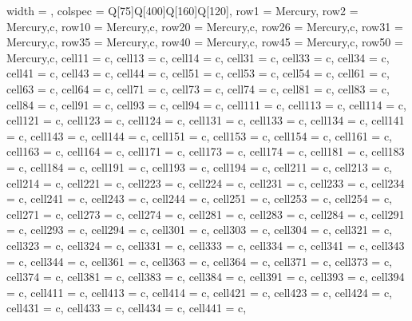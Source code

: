 \begin{longtblr}
[
caption={Tabela de requisitos funcionais},
label={tab:1},
]
{
 width = \linewidth,
 colspec = {Q[75]Q[400]Q[160]Q[120]},
 row{1} = {Mercury},
 row{2} = {Mercury,c},
 row{10} = {Mercury,c},
 row{20} = {Mercury,c},
 row{26} = {Mercury,c},
 row{31} = {Mercury,c},
 row{35} = {Mercury,c},
 row{40} = {Mercury,c},
 row{45} = {Mercury,c},
 row{50} = {Mercury,c},
 cell{1}{1} = {c},
 cell{1}{3} = {c},
 cell{1}{4} = {c},
 cell{3}{1} = {c},
 cell{3}{3} = {c},
 cell{3}{4} = {c},
 cell{4}{1} = {c},
 cell{4}{3} = {c},
 cell{4}{4} = {c},
 cell{5}{1} = {c},
 cell{5}{3} = {c},
 cell{5}{4} = {c},
 cell{6}{1} = {c},
 cell{6}{3} = {c},
 cell{6}{4} = {c},
 cell{7}{1} = {c},
 cell{7}{3} = {c},
 cell{7}{4} = {c},
 cell{8}{1} = {c},
 cell{8}{3} = {c},
 cell{8}{4} = {c},
 cell{9}{1} = {c},
 cell{9}{3} = {c},
 cell{9}{4} = {c},
 cell{11}{1} = {c},
 cell{11}{3} = {c},
 cell{11}{4} = {c},
 cell{12}{1} = {c},
 cell{12}{3} = {c},
 cell{12}{4} = {c},
 cell{13}{1} = {c},
 cell{13}{3} = {c},
 cell{13}{4} = {c},
 cell{14}{1} = {c},
 cell{14}{3} = {c},
 cell{14}{4} = {c},
 cell{15}{1} = {c},
 cell{15}{3} = {c},
 cell{15}{4} = {c},
 cell{16}{1} = {c},
 cell{16}{3} = {c},
 cell{16}{4} = {c},
 cell{17}{1} = {c},
 cell{17}{3} = {c},
 cell{17}{4} = {c},
 cell{18}{1} = {c},
 cell{18}{3} = {c},
 cell{18}{4} = {c},
 cell{19}{1} = {c},
 cell{19}{3} = {c},
 cell{19}{4} = {c},
 cell{21}{1} = {c},
 cell{21}{3} = {c},
 cell{21}{4} = {c},
 cell{22}{1} = {c},
 cell{22}{3} = {c},
 cell{22}{4} = {c},
 cell{23}{1} = {c},
 cell{23}{3} = {c},
 cell{23}{4} = {c},
 cell{24}{1} = {c},
 cell{24}{3} = {c},
 cell{24}{4} = {c},
 cell{25}{1} = {c},
 cell{25}{3} = {c},
 cell{25}{4} = {c},
 cell{27}{1} = {c},
 cell{27}{3} = {c},
 cell{27}{4} = {c},
 cell{28}{1} = {c},
 cell{28}{3} = {c},
 cell{28}{4} = {c},
 cell{29}{1} = {c},
 cell{29}{3} = {c},
 cell{29}{4} = {c},
 cell{30}{1} = {c},
 cell{30}{3} = {c},
 cell{30}{4} = {c},
 cell{32}{1} = {c},
 cell{32}{3} = {c},
 cell{32}{4} = {c},
 cell{33}{1} = {c},
 cell{33}{3} = {c},
 cell{33}{4} = {c},
 cell{34}{1} = {c},
 cell{34}{3} = {c},
 cell{34}{4} = {c},
 cell{36}{1} = {c},
 cell{36}{3} = {c},
 cell{36}{4} = {c},
 cell{37}{1} = {c},
 cell{37}{3} = {c},
 cell{37}{4} = {c},
 cell{38}{1} = {c},
 cell{38}{3} = {c},
 cell{38}{4} = {c},
 cell{39}{1} = {c},
 cell{39}{3} = {c},
 cell{39}{4} = {c},
 cell{41}{1} = {c},
 cell{41}{3} = {c},
 cell{41}{4} = {c},
 cell{42}{1} = {c},
 cell{42}{3} = {c},
 cell{42}{4} = {c},
 cell{43}{1} = {c},
 cell{43}{3} = {c},
 cell{43}{4} = {c},
 cell{44}{1} = {c},
}
\end{longtblr}
